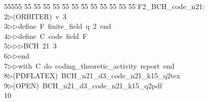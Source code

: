 %
%
\begin{tabbing}
55555 \= 55 \= 55 \= 55 \= 55 \= 55 \= 55 \= 55 \= 55 \= 55 \= 55 \= 55 \= 55 \= \>F2\_BCH\_code\_n21:\\[0pt]
2\>$\triangleright$\>(ORBITER)\ v\ 3\ \\[0pt]
3\>$\triangleright$\>$\triangleright$\>define\ F\ finite\_field\ q\ 2\ end\ \\[0pt]
4\>$\triangleright$\>$\triangleright$\>define\ C\ code\ field\ F\ \\[0pt]
5\>$\triangleright$\>$\triangleright$\>$\triangleright$\>BCH\ 21\ 3\ \\[0pt]
6\>$\triangleright$\>$\triangleright$\>end\ \\[0pt]
7\>$\triangleright$\>$\triangleright$\>with\ C\ do\ coding\_theoretic\_activity\ report\ end\\[0pt]
8\>$\triangleright$\>(PDFLATEX)\ BCH\_n21\_d3\_code\_n21\_k15\_q2tex\\[0pt]
9\>$\triangleright$\>(OPEN)\ BCH\_n21\_d3\_code\_n21\_k15\_q2pdf\\[0pt]
10\>\end{tabbing}

